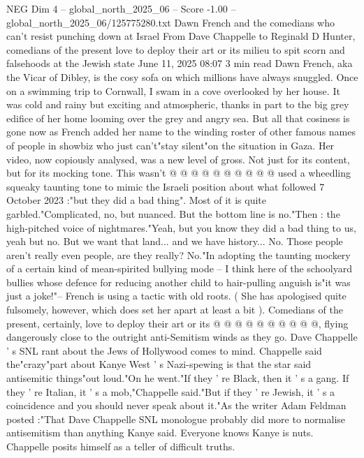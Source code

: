 \begin{textsample}{NEG Dim 4 – global\_north\_2025\_06 – Score -1.00 – global\_north\_2025\_06/125775280.txt}  \label{ex:f4_neg_061}
Dawn French and the comedians who can't resist punching down at Israel From Dave Chappelle to Reginald D Hunter, comedians of the present love to deploy their art or its milieu to spit scorn and falsehoods at the Jewish state June 11, 2025 08:07 3 min read Dawn French, aka the Vicar of Dibley, is the cosy sofa on which millions have always snuggled.
Once on a swimming trip to Cornwall, I swam in a cove overlooked by her house.
It was cold and rainy but exciting and atmospheric, thanks in part to the big grey edifice of her home looming over the grey and angry sea.
But all that cosiness is gone now as French added her name to the winding roster of other famous names of people in showbiz who just can't"stay silent"on the situation in Gaza.
Her video, now copiously analysed, was a new level of gross.
Not just for its content, but for its mocking tone.
This wasn't @ @ @ @ @ @ @ @ @ @ used a wheedling squeaky taunting tone to mimic the Israeli position about what followed 7 October 2023 :"but they did a bad thing".
Most of it is quite garbled."Complicated, no, but nuanced.
But the bottom line is no."Then : the high-pitched voice of nightmares."Yeah, but you know they did a bad thing to us, yeah but no.
But we want that land... and we have history...
No.
Those people aren't really even people, are they really?
No."In adopting the taunting mockery of a certain kind of mean-spirited bullying mode -- I think here of the schoolyard bullies whose defence for reducing another child to hair-pulling anguish is"it was just a joke!"-- French is using a tactic with old roots. ( She has apologised quite fulsomely, however, which does set her apart at least a bit ).
Comedians of the present, certainly, love to deploy their art or its @ @ @ @ @ @ @ @ @ @, flying dangerously close to the outright anti-Semitism winds as they go.
Dave Chappelle ' s SNL rant about the Jews of Hollywood comes to mind.
Chappelle said the"crazy"part about Kanye West ' s Nazi-spewing is that the star said antisemitic things"out loud."On he went."If they ' re Black, then it ' s a gang.
If they ' re Italian, it ' s a mob,"Chappelle said."But if they ' re Jewish, it ' s a coincidence and you should never speak about it."As the writer Adam Feldman posted :"That Dave Chappelle SNL monologue probably did more to normalise antisemitism than anything Kanye said.
Everyone knows Kanye is nuts.
Chappelle posits himself as a teller of difficult truths.

\end{textsample}
